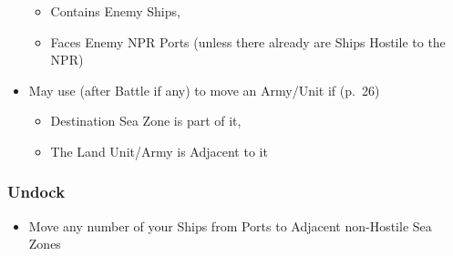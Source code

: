 \documentclass[10pt]{article}
\begin{document}
\begin{itemize}
	\begin{itemize}
		\item Contains Enemy Ships, 
		\item Faces Enemy NPR Ports (unless there already are Ships Hostile to the NPR)
	\end{itemize}
	\item {}May use  (after Battle if any) to move an Army/Unit if (p.~26)
	\begin{itemize}
		\item Destination Sea Zone is part of it, 
		\item The Land Unit/Army is Adjacent to it
	\end{itemize}
\end{itemize}

\subsubsection*{Undock}
\begin{itemize}
	\item Move any number of your Ships from Ports to Adjacent non-Hostile Sea Zones
\end{itemize}

\newlength{\arrowPortOneTurnY} \setlength{\arrowPortOneTurnY}{120mm}
\end{document}
